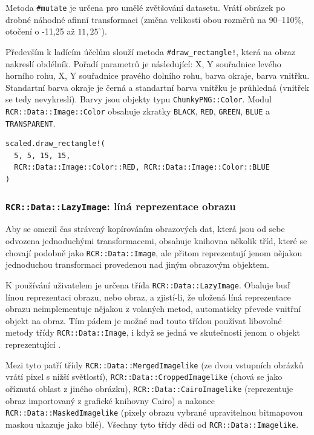 \documentclass[a4paper]{article}
\begin{document}
Metoda \texttt{\#mutate} je určena pro umělé zvětšování datasetu. Vrátí obrázek
po drobné náhodné afinní transformaci (změna velikosti obou rozměrů na 90--110\%,
otočení o -11,25 až $11,25^\circ$).

Především k ladícím účelům slouží metoda \texttt{\#draw\_rectangle!}, která na
obraz nakreslí obdélník. Pořadí parametrů je následující: X, Y souřadnice levého
horního rohu, X, Y souřadnice pravého dolního rohu, barva okraje, barva vnitřku.
Standartní barva okraje je černá a standartní barva vnitřku je průhledná
(vnitřek se tedy nevykreslí). Barvy jsou objekty typu \texttt{ChunkyPNG::Color}.
Modul \texttt{RCR::Data::Image::Color} obsahuje zkratky \texttt{BLACK},
\texttt{RED}, \texttt{GREEN}, \texttt{BLUE} a \texttt{TRANSPARENT}.
\begin{lstlisting}
scaled.draw_rectangle!(
  5, 5, 15, 15,
  RCR::Data::Image::Color::RED, RCR::Data::Image::Color::BLUE
)
\end{lstlisting}

\subsubsection{\texttt{RCR::Data::LazyImage}: líná reprezentace obrazu}
Aby se omezil čas strávený kopírováním obrazových dat, která jsou od sebe
odvozena jednoduchými transformacemi, obsahuje knihovna několik tříd, které
se chovají podobně jako \texttt{RCR::Data::Image}, ale přitom reprezentují
jenom nějakou jednoduchou transformaci provedenou nad jiným obrazovým objektem.

K používání uživatelem je určena třída \texttt{RCR::Data::LazyImage}.
Obaluje buď línou reprezentaci obrazu, nebo obraz, a zjistí-li, že uložená
líná reprezentace obrazu neimplementuje nějakou z volaných metod, automaticky
převede vnitřní objekt na obraz. Tím pádem je možné nad touto třídou používat
libovolné metody třídy \texttt{RCR::Data::Image}, i když se jedná ve skutečnosti
jenom o objekt reprezentující .

Mezi tyto  patří třídy
\texttt{RCR::Data::MergedImagelike} (ze dvou vstupních obrázků vrátí pixel
s nižší světlostí), \texttt{RCR::Data::CroppedImagelike} (chová se jako
oříznutá oblast z jiného obrázku), \texttt{RCR::Data::CairoImagelike}
(reprezentuje obraz importovaný z grafické knihovny Cairo) a nakonec
\texttt{RCR::Data::MaskedImagelike} (pixely obrazu vybrané upravitelnou
bitmapovou maskou ukazuje jako bílé).
Všechny tyto třídy dědí od \texttt{RCR::Data::Imagelike}.
\end{document}
